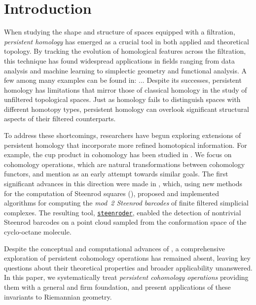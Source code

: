 
\section{Introduction} \label{s:introduction}

When studying the shape and structure of spaces equipped with a filtration, \textit{persistent homology} has emerged as a crucial tool in both applied and theoretical topology.
By tracking the evolution of homological features across the filtration, this technique has found widespread applications in fields ranging from data analysis and machine learning to simplectic geometry and functional analysis.
A few among many examples can be found in: ...
Despite its successes, persistent homology has limitations that mirror those of classical homology in the study of unfiltered topological spaces.
Just as homology fails to distinguish spaces with different homotopy types, persistent homology can overlook significant structural aspects of their filtered counterparts.

To address these shortcomings, researchers have begun exploring extensions of persistent homology that incorporate more refined homotopical information.
For example, the cup product in cohomology has been studied in \cite{contessoto_et_al:LIPIcs.SoCG.2022.31, memoli2024persistent, huang2005cup, yarmola2010persistence, herscovich2018higher, belchi2021a, contreras2022persistent}.
We focus on cohomology operations, which are natural transformations between cohomology functors, and mention \cite{aubrey2011thesis} as an early attempt towards similar goals.
The first significant advances in this direction were made in \cite{medina2022per_st}, which, using new methods for the computation of Steenrod squares (\cite{medina2023fast_sq}), proposed and implemented algorithms for computing the \textit{mod~2 Steenrod barcodes} of finite filtered simplicial complexes.
The resulting tool, \href{https://steenroder.github.io/steenroder/}{\texttt{steenroder}}, enabled the detection of nontrivial Steenrod barcodes on a point cloud sampled from the conformation space of the cyclo-octane molecule.

Despite the conceptual and computational advances of \cite{medina2022per_st}, a comprehensive exploration of persistent cohomology operations has remained absent, leaving key questions about their theoretical properties and broader applicability unanswered.
In this paper, we systematically treat \textit{persistent cohomology operations} providing them with a general and firm foundation, and present applications of these invariants to Riemannian geometry.

